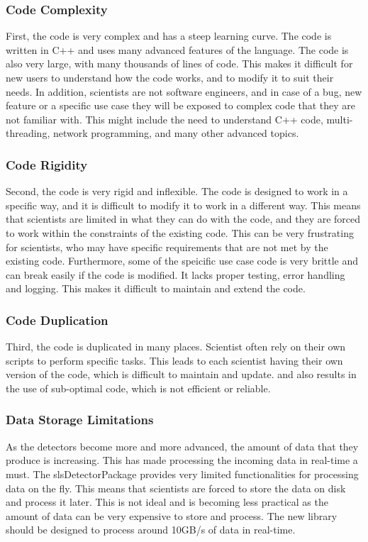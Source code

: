 \begin{spacing}{1.2}
    \subsubsection{Code Complexity}
    First, the code is very complex and has a steep learning curve. The code is written in C++ and uses
    many advanced features of the language. The code is also very large, with many thousands of lines of code.
    This makes it difficult for new users to understand how the code works, and to modify it to suit their needs.
    In addition, scientists are not software engineers, and in case of a bug, new feature or a specific use case
    they will be exposed to complex code that they are not familiar with. This might include the need to understand
    C++ code, multi-threading, network programming, and many other advanced topics.


    \subsubsection{Code Rigidity}
    Second, the code is very rigid and inflexible. The code is designed to work in a specific way, and it is difficult
    to modify it to work in a different way. This means that scientists are limited in what they can do with the code,
    and they are forced to work within the constraints of the existing code. This can be very frustrating for scientists,
    who may have specific requirements that are not met by the existing code.
    Furthermore, some of the speicific use case code is very brittle and can break easily if the code is modified.
    It lacks proper testing, error handling and logging. This makes it difficult to maintain and extend the code.


    \subsubsection{Code Duplication}
    Third, the code is duplicated in many places. Scientist often rely on their own scripts to perform specific tasks.
    This leads to each scientist having their own version of the code, which is difficult to maintain and update.
    and also results in the use of sub-optimal code, which is not efficient or reliable.


    \subsubsection{Data Storage Limitations}
    As the detectors become more and more advanced, the amount of data that they produce is increasing.
    This has made processing the incoming data in real-time a must. The slsDetectorPackage provides very limited
    functionalities for processing data on the fly. This means that scientists are forced to store the data on disk
    and process it later. This is not ideal and is becoming less practical as the amount of data can be very expensive to
    store and process. The new library should be designed to process around 10GB/s of data in real-time.


\end{spacing}
